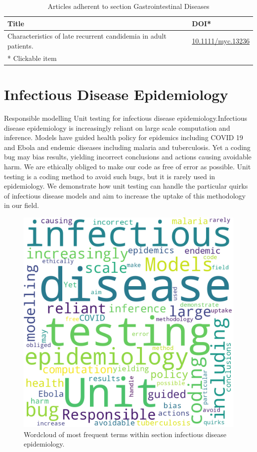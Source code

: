 \documentclass{qqtarticle}
\begin{document}
        \begin{table}[H]
            \scriptsize
            \centering
            \caption{Articles adherent to section Gastrointestinal Diseases}
            \renewcommand{\arraystretch}{1.5}
            \begin{tabular}{p{}l}
                \toprule 
                Title & DOI* \\     \midrule Characteristics of late recurrent candidemia in adult patients. \cite{Characteri6287ec6b} & \href{https://dx.doi.org/10.1111/myc.13236}{10.1111/myc.13236}\\     \midrule
                * Clickable item \\
                \bottomrule
            \end{tabular}
            \label{tab:topic6}
        \end{table}
        
    \section{Infectious Disease Epidemiology}
        Responsible modelling  Unit testing for infectious disease epidemiology.Infectious disease epidemiology is increasingly reliant on large scale computation and inference. Models have guided health policy for epidemics including COVID 19 and Ebola and endemic diseases including malaria and tuberculosis. Yet a coding bug may bias results, yielding incorrect conclusions and actions causing avoidable harm. We are ethically obliged to make our code as free of error as possible. Unit testing is a coding method to avoid such bugs, but it is rarely used in epidemiology. We demonstrate how unit testing can handle the particular quirks of infectious disease models and aim to increase the uptake of this methodology in our field.

        \begin{figure}[H]
            \centering
            \includegraphics[width=.75\linewidth]{img/infectiousdiseaseepidemiology.png}
            \caption{Wordcloud of most frequent terms within section infectious disease epidemiology.}
            \label{fig:wcl_infectiousdiseaseepidemiology}
        \end{figure}
\end{document}

